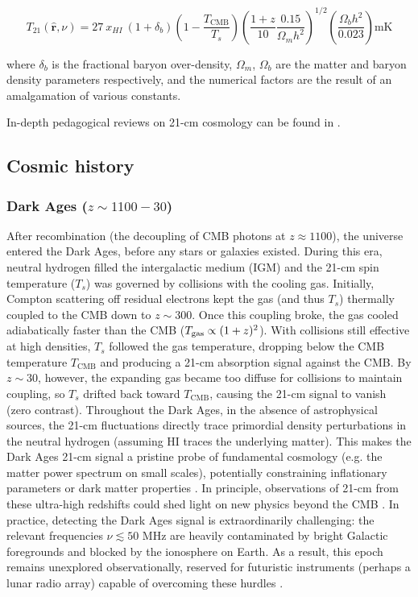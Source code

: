 \documentclass[floats,floatfix,showpacs,amssymb,prd,superscriptaddress,nofootinbib]{revtex4-2} %
\begin{document}
\begin{equation}
    T_{21} (\hat{\textbf{r}}, \nu) = 27 \ x_{HI} \ (1 + \delta_b) \left(1 - \frac{T_{\text{CMB}}}{T_s} \right) \left(\frac{1 + z}{10} \frac{0.15}{\Omega_m h^2} \right)^{1/2} \left( \frac{\Omega_b h^2}{0.023} \right) \text{mK}
    \label{eq:brightness_temperature_approx}
\end{equation}

\noindent where $\delta_b$ is the fractional baryon over-density, $\Omega_m$, $\Omega_b$ are the matter and baryon density parameters respectively, and the numerical factors are the result of an amalgamation of various constants. 

In-depth pedagogical reviews on 21-cm cosmology can be found in \citet{Barkana_Loeb_2001, Furlanetto_2006, Pritchard_Loeb_2012, Barkana_2016, Mesinger_2019, Liu_Shaw_2020}.

\subsection{Cosmic history}
\subsubsection{Dark Ages ($z \sim 1100-30$)}
After recombination (the decoupling of CMB photons at $z \approx 1100$), the universe entered the Dark Ages, before any stars or galaxies existed. During this era, neutral hydrogen filled the intergalactic medium (IGM) and the 21-cm spin temperature ($T_s$) was governed by collisions with the cooling gas. Initially, Compton scattering off residual electrons kept the gas (and thus $T_s$) thermally coupled to the CMB down to $z\sim300$. Once this coupling broke, the gas cooled adiabatically faster than the CMB (${T_{\rm gas}}\propto(1+z)^2$). With collisions still effective at high densities, $T_s$ followed the gas temperature, dropping below the CMB temperature $T_{\text{CMB}}$ and producing a 21-cm absorption signal against the CMB. By $z\sim30$, however, the expanding gas became too diffuse for collisions to maintain coupling, so $T_s$ drifted back toward $T_{\text{CMB}}$, causing the 21-cm signal to vanish (zero contrast). Throughout the Dark Ages, in the absence of astrophysical sources, the 21-cm fluctuations directly trace primordial density perturbations in the neutral hydrogen (assuming HI traces the underlying matter). This makes the Dark Ages 21-cm signal a pristine probe of fundamental cosmology (e.g. the matter power spectrum on small scales), potentially constraining inflationary parameters or dark matter properties \citep{Loeb_Zaldarriaga_2004}.
In principle, observations of 21-cm from these ultra-high redshifts could shed light on new physics beyond the CMB \citep{Scott_Rees_1990}.
In practice, detecting the Dark Ages signal is extraordinarily challenging: the relevant frequencies $\nu \lesssim 50$ MHz are heavily contaminated by bright Galactic foregrounds and blocked by the ionosphere on Earth. As a result, this epoch remains unexplored observationally, reserved for futuristic instruments (perhaps a lunar radio array) capable of overcoming these hurdles \citep{Tegmark_Zaldarriaga_2009}.
\end{document}
